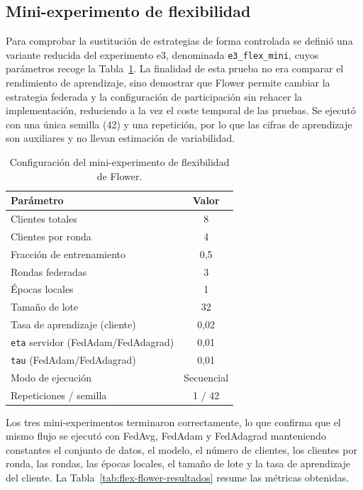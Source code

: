 \subsection{Mini-experimento de flexibilidad}\label{subsec:flex-flower-mini}

Para comprobar la sustitución de estrategias de forma controlada se definió una
variante reducida del experimento e3, denominada \texttt{e3\_flex\_mini}, cuyos
parámetros recoge la Tabla~\ref{tab:flex-flower-config}. La finalidad de esta
prueba no era comparar el rendimiento de aprendizaje, sino demostrar que Flower
permite cambiar la estrategia federada y la configuración de participación sin
rehacer la implementación, reduciendo a la vez el coste temporal de las pruebas.
Se ejecutó con una única semilla (42) y una repetición, por lo que las cifras de
aprendizaje son auxiliares y no llevan estimación de variabilidad.

\begin{table}[htbp]
  \centering
  \caption{Configuración del mini-experimento de flexibilidad de Flower.}
  \label{tab:flex-flower-config}
  \begin{tabular}{lc}
    \toprule
    \textbf{Parámetro} & \textbf{Valor} \\
    \midrule
    Clientes totales & 8 \\
    Clientes por ronda & 4 \\
    Fracción de entrenamiento & 0,5 \\
    Rondas federadas & 3 \\
    Épocas locales & 1 \\
    Tamaño de lote & 32 \\
    Tasa de aprendizaje (cliente) & 0,02 \\
    \texttt{eta} servidor (FedAdam/FedAdagrad) & 0,01 \\
    \texttt{tau} (FedAdam/FedAdagrad) & 0,01 \\
    Modo de ejecución & Secuencial \\
    Repeticiones / semilla & 1 / 42 \\
    \bottomrule
  \end{tabular}
\end{table}

Los tres mini-experimentos terminaron correctamente, lo que confirma que el mismo
flujo se ejecutó con FedAvg, FedAdam y FedAdagrad manteniendo constantes el
conjunto de datos, el modelo, el número de clientes, los clientes por ronda, las
rondas, las épocas locales, el tamaño de lote y la tasa de aprendizaje del
cliente. La Tabla~\ref{tab:flex-flower-resultados} resume las métricas obtenidas.

